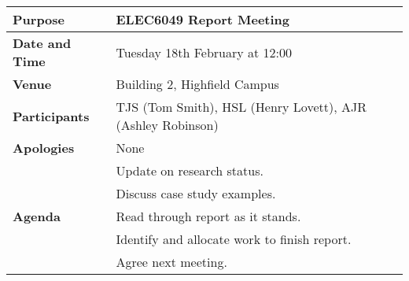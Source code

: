 {}
\begin{center}
\begin{longtable}{| m{} | m{} |} \hline
\textbf{Purpose} & ELEC6049 Report Meeting \\ \hline
\textbf{Date and Time} & Tuesday 18th February at 12:00 \\ \hline
\textbf{Venue} & Building 2, Highfield Campus \\ \hline
\textbf{Participants} & TJS (Tom Smith), HSL (Henry Lovett), AJR (Ashley Robinson)\\ \hline
\textbf{Apologies} & None \\ \hline
\multirow{5}{*}{\textbf{Agenda}} & Update on research status. \\
 & Discuss case study examples. \\ 
 & Read through report as it stands. \\
 & Identify and allocate work to finish report. \\ 
 & Agree next meeting. \\ \hline
\end{longtable}
\end{center}

